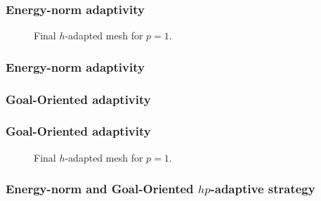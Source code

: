 \begin{frame}
  \frametitle{Energy-norm adaptivity}

  \begin{figure}
    \centering
    
    \caption{Final $h$-adapted mesh for $p=1$.}
  \end{figure}

\end{frame}

\begin{frame}
	\frametitle{Energy-norm adaptivity}
	\begin{figure}[htp!]
	\end{figure}
\end{frame}

\begin{frame}
	\frametitle{Goal-Oriented adaptivity}
\end{frame}

\begin{frame}
  \frametitle{Goal-Oriented adaptivity}

  \begin{figure}
    \centering
    
    \caption{Final $h$-adapted mesh for $p=1$.}
  \end{figure}

\end{frame}

\begin{frame}
	\frametitle{Energy-norm and Goal-Oriented $hp$-adaptive strategy}
	\begin{figure}[htp!]
	\end{figure}
\end{frame}